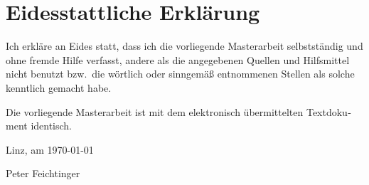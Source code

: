 \chapter{Eidesstattliche Erklärung}
\begin{otherlanguage}{ngerman}

Ich erkläre an Eides statt, dass ich die vorliegende Masterarbeit selbstständig und ohne fremde Hilfe verfasst, andere 
als die angegebenen Quellen und Hilfsmittel nicht benutzt bzw.\ die wörtlich oder sinngemäß entnommenen Stellen als 
solche kenntlich gemacht habe.

Die vorliegende Masterarbeit ist mit dem elektronisch übermittelten Textdokument identisch.


Linz, am \today

\vspace{3em}
\hfill Peter Feichtinger

\end{otherlanguage}
